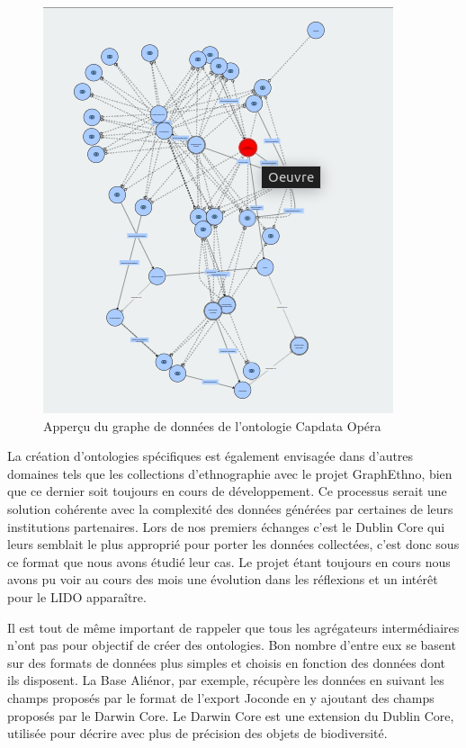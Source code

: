 \begin{figure}[h!]
	\centerline{\includegraphics[width=\textwidth]{medias/capData_opera.png}}
	\caption{Apperçu du graphe de données de l'ontologie Capdata Opéra}
\end{figure}

La création d'ontologies spécifiques est également envisagée dans d'autres domaines tels que les collections d'ethnographie avec le projet GraphEthno, bien que ce dernier soit toujours en cours de développement.  Ce processus serait une solution cohérente avec la complexité des données générées par certaines de leurs institutions partenaires. Lors de nos premiers échanges c’est le Dublin Core qui leurs semblait le plus approprié pour porter les données collectées, c’est donc sous ce format que nous avons étudié leur cas. Le projet étant toujours en cours nous avons pu voir au cours des mois une évolution dans les réflexions et un intérêt pour le LIDO apparaître. \newline

Il est tout de même important de rappeler que tous les agrégateurs intermédiaires n’ont pas pour objectif de créer des ontologies. Bon nombre d’entre eux se basent sur des formats de données plus simples et choisis en fonction des données dont ils disposent. La Base Aliénor, par exemple, récupère les données en suivant les champs proposés par le format de l’export Joconde en y ajoutant des champs proposés par le Darwin Core. Le Darwin Core est une extension du Dublin Core, utilisée pour décrire avec plus de précision des objets de biodiversité.\newline

